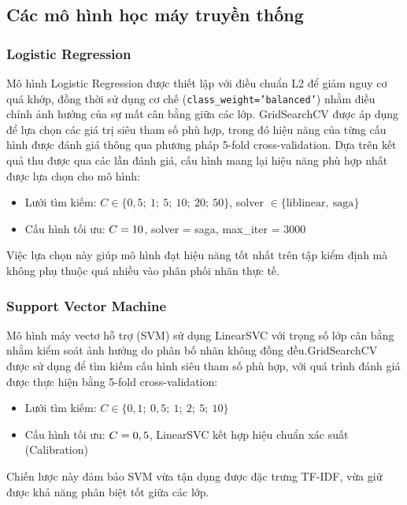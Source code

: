 \subsection{Các mô hình học máy truyền thống}

\subsubsection{Logistic Regression}

Mô hình Logistic Regression được thiết lập với điều chuẩn L2 để giảm nguy cơ quá khớp, đồng thời sử dụng cơ chế (\texttt{class\_weight='balanced'}) nhằm điều chỉnh ảnh hưởng của sự mất cân bằng giữa các lớp. GridSearchCV được áp dụng để lựa chọn các giá trị siêu tham số phù hợp, trong đó hiệu năng của từng cấu hình được đánh giá thông qua phương pháp 5-fold cross-validation. Dựa trên kết quả thu được qua các lần đánh giá, cấu hình mang lại hiệu năng phù hợp nhất được lựa chọn cho mô hình:

\begin{itemize}[leftmargin=2em]
  \item Lưới tìm kiếm: $C \in \{0{,}5;\ 1;\ 5;\ 10;\ 20;\ 50\}$, solver $\in \{\text{liblinear},\ \text{saga}\}$
  \item Cấu hình tối ưu: $C = 10{}$, solver = saga, max\_iter = 3000
\end{itemize}

Việc lựa chọn này giúp mô hình đạt hiệu năng tốt nhất trên tập kiểm định mà không phụ thuộc quá nhiều vào phân phối nhãn thực tế.

\subsubsection{Support Vector Machine}

Mô hình máy vectơ hỗ trợ (SVM) sử dụng LinearSVC với trọng số lớp cân bằng nhằm kiểm soát ảnh hưởng do phân bố nhãn không đồng đều.GridSearchCV được sử dụng để tìm kiếm cấu hình siêu tham số phù hợp, với quá trình đánh giá được thực hiện bằng 5-fold cross-validation:
\begin{itemize}[leftmargin=2em]
  \item Lưới tìm kiếm: $C \in \{0{,}1;\ 0{,}5;\ 1;\ 2;\ 5;\ 10\}$
  \item Cấu hình tối ưu: $C = 0,5$, LinearSVC kết hợp hiệu chuẩn xác suất (Calibration)
\end{itemize}

Chiến lược này đảm bảo SVM vừa tận dụng được đặc trưng TF-IDF, vừa giữ được khả năng phân biệt tốt giữa các lớp.

